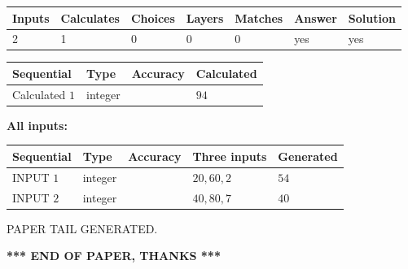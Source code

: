 \documentclass[12pt]{article}
\begin{document}
 

 
   
   
   
   
\noindent\begin{tabular}{|l|l|l|l|l|l|l|}
 \hline
Inputs & Calculates & Choices & Layers & Matches & Answer & Solution \\ \hline
 2  & 
 1  & 
 0
  & 
 0  & 
 0  & 
  yes & 
  yes 
  \\ \hline
 \end{tabular}
   
   
   
   
\noindent{}
   
   
  
  
\noindent\begin{tabular}{|l|l|l|l|}
\hline
 Sequential & Type & Accuracy & Calculated \\ 
\hline
 
 
  Calculated $  1 $ & integer &  & 
  $ 94 $ 
 \\  \hline  
 \end{tabular}
   
   
   
   
\noindent\vspace{0.1in}\hspace{-0.08in} {\textbf{\Large{All inputs: }}}
   
   
  
  
\noindent\begin{tabular}{|l|l|l|l|l|}
\hline
 Sequential & Type & Accuracy & Three inputs & Generated \\ 
\hline
 
 
  INPUT $  1 $ & integer &  & $
 20
 , 
 60
 , 
 2
 $ & $ 54 $ 
 \\  \hline  
 
 
  INPUT $  2 $ & integer &  & $
 40
 , 
 80
 , 
 7
 $ & $ 40 $ 
 \\  \hline  
 \end{tabular}
   
   
   
   
   
   
 \vspace{0.2in}
 
   
   
\vspace{2.0in} PAPER TAIL GENERATED.
   
   
   
   
\vspace{1.0in} 
{\textbf{\large{ *** END OF PAPER, THANKS *** }}} 
   
\end{document}
